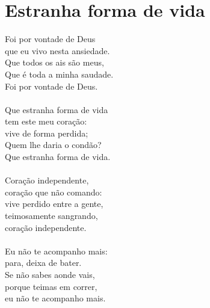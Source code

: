 \documentclass{article}
\begin{document}
\section{ Estranha forma de vida}
Foi por vontade de Deus\\
que eu vivo nesta ansiedade.\\
Que todos os ais são meus,\\
Que é toda a minha saudade.\\
Foi por vontade de Deus.\\
\\
Que estranha forma de vida\\
tem este meu coração:\\
vive de forma perdida;\\
Quem lhe daria o condão?\\
Que estranha forma de vida.\\
\\
Coração independente,\\
coração que não comando:\\
vive perdido entre a gente,\\
teimosamente sangrando,\\
coração independente.\\
\\
Eu não te acompanho mais:\\
para, deixa de bater.\\
Se não sabes aonde vais,\\
porque teimas em correr,\\
eu não te acompanho mais.\\
\\
\\
\end{document}
